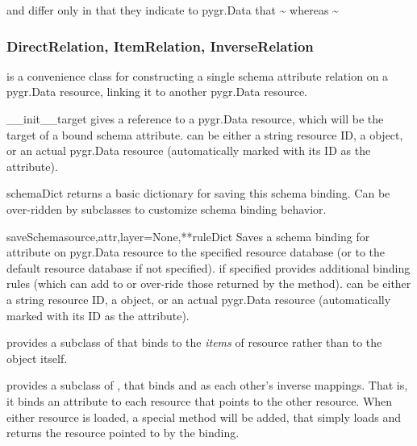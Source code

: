 \documentclass{howto}
\begin{document}
 and  differ only in that
they indicate to pygr.Data that \textasciitilde{} whereas 
\textasciitilde{}

\subsubsection{DirectRelation, ItemRelation, InverseRelation}
 is a convenience class for constructing 
a single schema attribute relation on a pygr.Data resource,
linking it to another pygr.Data resource.
\begin{funcdesc}{__init__}{target}
   gives a reference to a pygr.Data resource, which will
  be the target of a bound schema attribute.   can be either
  a string resource ID, a  object, or
  an actual pygr.Data resource (automatically marked with its ID
  as the  attribute).
\end{funcdesc}

\begin{funcdesc}{schemaDict}{}
  returns a basic  dictionary for saving this schema binding.
  Can be over-ridden by subclasses to customize schema binding behavior.
\end{funcdesc}

\begin{funcdesc}{saveSchema}{source,attr,layer=None,**ruleDict}
  Saves a schema binding for attribute  on pygr.Data resource
   to the specified resource database  (or
  to the default resource database if not specified).  
  if specified provides additional binding rules (which can add to or
  over-ride those returned by the  method).
   can be either
  a string resource ID, a  object, or
  an actual pygr.Data resource (automatically marked with its ID
  as the  attribute).
\end{funcdesc}

 provides a subclass of 
that binds to the {\em items} of resource  rather than to the
 object itself.

 provides a subclass of ,
that binds  and  as each other's inverse mappings.
That is, it binds an  attribute to each resource
that points to the other resource.  When either resource is loaded,
a special  method will be added, that simply
loads and returns the resource pointed to by the 
binding.
\end{document}
